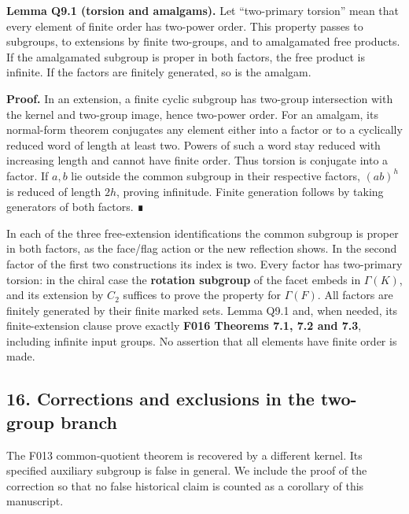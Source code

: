 \documentclass[
  10pt,
  letterpaper,
]{article}
\begin{document}
\textbf{Lemma Q9.1 (torsion and amalgams).} Let ``two-primary torsion''
mean that every element of finite order has two-power order. This
property passes to subgroups, to extensions by finite two-groups, and to
amalgamated free products. If the amalgamated subgroup is proper in both
factors, the free product is infinite. If the factors are finitely
generated, so is the amalgam.

\textbf{Proof.} In an extension, a finite cyclic subgroup has two-group
intersection with the kernel and two-group image, hence two-power order.
For an amalgam, its normal-form theorem conjugates any element either
into a factor or to a cyclically reduced word of length at least two.
Powers of such a word stay reduced with increasing length and cannot
have finite order. Thus torsion is conjugate into a factor. If \(a,b\)
lie outside the common subgroup in their respective factors, \((ab)^h\)
is reduced of length \(2h\), proving infinitude. Finite generation
follows by taking generators of both factors. ∎

In each of the three free-extension identifications the common subgroup
is proper in both factors, as the face/flag action or the new reflection
shows. In the second factor of the first two constructions its index is
two. Every factor has two-primary torsion: in the chiral case the
\textbf{rotation subgroup} of the facet embeds in \(\Gamma(K)\), and its
extension by \(C_2\) suffices to prove the property for \(\Gamma(F)\).
All factors are finitely generated by their finite marked sets. Lemma
Q9.1 and, when needed, its finite-extension clause prove exactly
\textbf{F016 Theorems 7.1, 7.2 and 7.3}, including infinite input
groups. No assertion that all elements have finite order is made.

\subsection{16. Corrections and exclusions in the two-group
branch}\label{corrections-and-exclusions-in-the-two-group-branch}

The F013 common-quotient theorem is recovered by a different kernel. Its
specified auxiliary subgroup is false in general. We include the proof
of the correction so that no false historical claim is counted as a
corollary of this manuscript.
\end{document}
